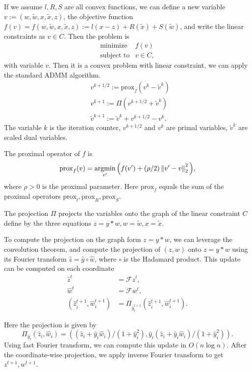 \documentclass[12pt]{article}
\begin{document}
If we assume $l,R,S$ are all convex functions, we can define a new variable $v := (w, \tilde{w},x, \tilde{x}, z)$, 
the objective function $f(v) = f(w, \tilde{w},x, \tilde{x}, z):=l(x-z)+R(\tilde{x})+ S(\tilde{w})$, and write the linear constraints as $v\in C$. 
Then the problem is
\[
\begin{array}{ll}
\mbox{minimize}   & f(v) \\
\mbox{subject to} & v\in C,
\end{array}
\]
with variable $v$.
Then it is a convex problem with linear constraint, we can apply the standard ADMM algorithm. 
\[
\begin{array}{ll}
&v^{k+1/2} := \mathrm{prox}_{f}(v^{k}-\tilde{v}^{k})\\
&v^{k+1} :=  \Pi\left(v^{k+1/2}+\tilde{v}^k\right)\\
&\tilde{v}^{k+1} :=  \tilde{v}^k + v^{k+1/2} - v^k.
\end{array}
\]
The variable $k$ is the iteration counter, $v^{k+1/2}$ and $v^{k}$  are primal
variables, $\tilde{v}^k$ are scaled dual variables.

The proximal operator of $f$ is
\[
    \mathrm{prox}_{f}(v) = \mathop{\rm argmin}_{v'}\Big(f(v') + (\rho/2) \left\|v' - v\right\|_2^2\Big),
\]
where $\rho>0$ is the proximal parameter. Here $\mathrm{prox}_{f}$ equals the sum of the proximal operators $\mathrm{prox}_{l},\mathrm{prox}_{R},\mathrm{prox}_{S}$.

The projection $\Pi$ projects the variables onto the graph of the linear constraint $C$ define by the three equations $z = y*w, w = \tilde{w}, x = \tilde{x}$. 

To compute the projection on the graph form  $z = y*w$, we can leverage the convolution theorem, 
and compute the projection of $(z,w)$ onto $z = y*w$ using its Fourier transform  $\hat z =\hat y  \circ \hat w$, where $ \circ$ is the Hadamard product.  
This update can be computed on each coordinate
\[
\begin{array}{ll}
    \hat z^{t} &= \mathcal{F}  z^{t},\\
    \hat w^{t} &= \mathcal{F}  w^{t}, \\
 (\hat z^{t+1}_i, \hat w^{t+1}_i) &= \Pi_{\hat y^{t+1}_i}(\hat z^{t+1}_i, \hat w^{t+1}_i).
\end{array}
\]
  
Here the projection is given by
\[
 \Pi_{\hat y_i}(\hat z_i, \hat w_i)= ((\hat z_i+ \hat y_i \hat w_i)/(1+\hat y_i^2), \hat y_i(\hat z_i+ \hat y_i \hat w_i)/(1+\hat y_i^2)).
\]
 Using fast Fourier transform, we can compute this update in $O(n\log n)$.
 After the coordinate-wise projection, we apply inverse Fourier transform to get 
 $z^{t+1}, w^{t+1}$.
\end{document}
